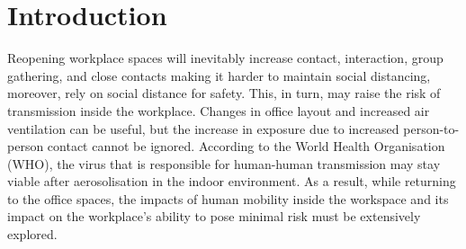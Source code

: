 \documentclass[acmtog]{acmart}
\begin{document}
\section{Introduction}
Reopening workplace spaces will inevitably increase contact, interaction, group gathering, and close contacts making it harder to maintain social distancing, moreover, rely on social distance for safety. This, in turn, may raise the risk of transmission inside the workplace. Changes in office layout and increased air ventilation can be useful, but the increase in exposure due to increased person-to-person contact cannot be ignored. According to the World Health Organisation (WHO), the virus that is responsible for human-human transmission may stay viable after aerosolisation in the indoor environment. As a result, while returning to the office spaces, the impacts of human mobility inside the workspace and its impact on the workplace's ability to pose minimal risk must be extensively explored.
\end{document}
